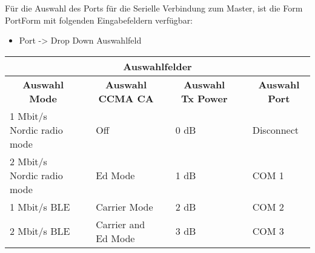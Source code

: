 \vspace{3mm}
Für die Auswahl des Ports für die Serielle Verbindung zum Master, ist die Form PortForm mit folgenden Eingabefeldern verfügbar:
\begin{itemize}
	\item  Port \hspace{22mm} -> Drop Down Auswahlfeld
\end{itemize}

\begin{table}[H]
	\centering
	\begin{adjustbox}{width=1\textwidth}
		\begin{tabular}{@{}llll|l|l|l|@{}}
			\toprule
			\multicolumn{7}{|c|}{\textbf{Auswahlfelder}}                                                                                                                                                                                    \\ \midrule
			\multicolumn{1}{|c|}{\textbf{Auswahl Mode}}         & \multicolumn{1}{l|}{} & \multicolumn{1}{c|}{\textbf{Auswahl CCMA CA}} &  & \multicolumn{1}{c|}{\textbf{Auswahl Tx Power}} &  & \multicolumn{1}{c|}{\textbf{Auswahl Port}} \\ \cmidrule(r){1-1} \cmidrule(lr){3-3} \cmidrule(lr){5-5} \cmidrule(l){7-7} 
			\multicolumn{1}{|l|}{1 Mbit/s Nordic radio mode}    & \multicolumn{1}{l|}{} & \multicolumn{1}{l|}{Off}                      &  & 0 dB                                           &  & Disconnect                                 \\ \cmidrule(r){1-1} \cmidrule(lr){3-3} \cmidrule(lr){5-5} \cmidrule(l){7-7} 
			\multicolumn{1}{|l|}{2 Mbit/s Nordic radio mode}    & \multicolumn{1}{l|}{} & \multicolumn{1}{l|}{Ed Mode}                  &  & 1 dB                                           &  & COM 1                                      \\ \cmidrule(r){1-1} \cmidrule(lr){3-3} \cmidrule(lr){5-5} \cmidrule(l){7-7} 
			\multicolumn{1}{|l|}{1 Mbit/s BLE}                  & \multicolumn{1}{l|}{} & \multicolumn{1}{l|}{Carrier Mode}             &  & 2 dB                                           &  & COM 2                                      \\ \cmidrule(r){1-1} \cmidrule(lr){3-3} \cmidrule(lr){5-5} \cmidrule(l){7-7} 
			\multicolumn{1}{|l|}{2 Mbit/s BLE}                  & \multicolumn{1}{l|}{} & \multicolumn{1}{l|}{Carrier and Ed Mode}      &  & 3 dB                                           &  & COM 3                                      \\ \cmidrule(r){1-1} \cmidrule(lr){3-3} \cmidrule(lr){5-5} \cmidrule(l){7-7} 

\end{tabular}
\end{adjustbox}
\end{table}

